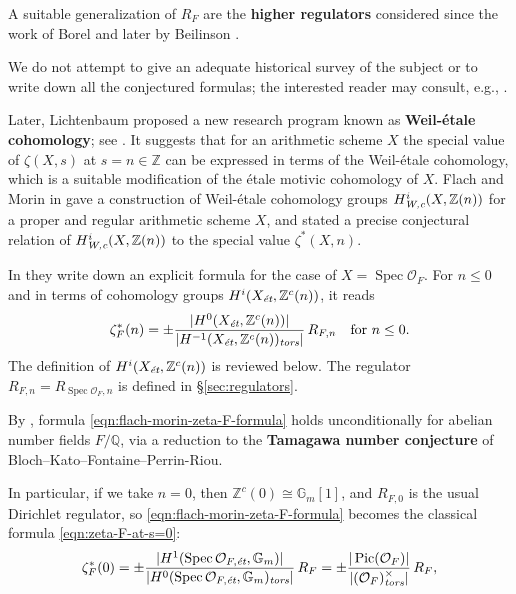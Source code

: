 \documentclass{article}
\DeclareMathOperator{\Pic}{Pic}
\DeclareMathOperator{\Spec}{Spec}
\newcommand{\QQ}{\mathbb{Q}}
\newcommand{\ZZ}{\mathbb{Z}}
\newcommand{\et}{\text{\it \'{e}t}}
\newcommand{\tors}{\text{\it tors}}
\newcommand{\Wc}{\text{\it W,c}}
\theoremstyle{myplain}
\theoremstyle{mydefinition}
\begin{document}
A suitable generalization of $R_F$ are the \textbf{higher regulators} considered
since the work of Borel \cite{Borel-1977} and later by Beilinson
\cite{Beilinson-1984}.

We do not attempt to give an adequate historical survey of the subject or to
write down all the conjectured formulas; the interested reader may consult,
e.g., \cite{Kolster-2004,Goncharov-2005,Kahn-2005}.

\vspace{1em}

Later, Lichtenbaum proposed a new research program known as
\textbf{Weil-\'{e}tale cohomology}; see
\cite{Lichtenbaum-2005,Lichtenbaum-2009-Euler-char,Lichtenbaum-2009-number-rings,Lichtenbaum-2021}.
It suggests that for an arithmetic scheme $X$ the special value of $\zeta (X,s)$
at $s = n \in \ZZ$ can be expressed in terms of the Weil-\'{e}tale cohomology,
which is a suitable modification of the \'{e}tale motivic cohomology of $X$.
Flach and Morin in \cite{Flach-Morin-2018} gave a construction of Weil-\'{e}tale
cohomology groups $H^i_\Wc (X,\ZZ(n))$ for a proper and regular arithmetic
scheme $X$, and stated a precise conjectural relation of $H^i_\Wc (X,\ZZ(n))$ to
the special value $\zeta^* (X,n)$.

In \cite[\S 5.8.3]{Flach-Morin-2018} they write down an explicit formula for the
case of $X = \Spec \mathcal{O}_F$. For $n \le 0$ and in terms of cohomology
groups $H^i (X_\et, \ZZ^c (n))$, it reads
\begin{equation}
  \label{eqn:flach-morin-zeta-F-formula}
  \zeta_F^* (n) = \pm\frac{|H^0 (X_\et, \ZZ^c (n))|}{|H^{-1} (X_\et, \ZZ^c (n))_\tors|}\,R_{F,n}
  \quad \text{for }n \le 0.
\end{equation}
The definition of $H^i (X_\et, \ZZ^c (n))$ is reviewed below.
The regulator $R_{F,n} = R_{\Spec \mathcal{O}_F,n}$ is defined in
\S\ref{sec:regulators}.

By \cite[Proposition~5.35]{Flach-Morin-2018}, formula
\eqref{eqn:flach-morin-zeta-F-formula} holds unconditionally for abelian number
fields $F/\QQ$, via a reduction to the \textbf{Tamagawa number conjecture} of
Bloch--Kato--Fontaine--Perrin-Riou.

In particular, if we take $n = 0$, then $\ZZ^c (0) \cong \mathbb{G}_m [1]$, and
$R_{F,0}$ is the usual Dirichlet regulator, so
\eqref{eqn:flach-morin-zeta-F-formula} becomes the classical formula
\eqref{eqn:zeta-F-at-s=0}:
\[ \zeta_F^* (0) =
  \pm \frac{|H^1 (\Spec \mathcal{O}_{F,\et}, \mathbb{G}_m)|}{|H^0 (\Spec \mathcal{O}_{F,\et}, \mathbb{G}_m)_\tors|}\,R_F =
  \pm \frac{|\Pic (\mathcal{O}_F)|}{|(\mathcal{O}_F)^\times_\tors|}\,R_F, \]
\end{document}
